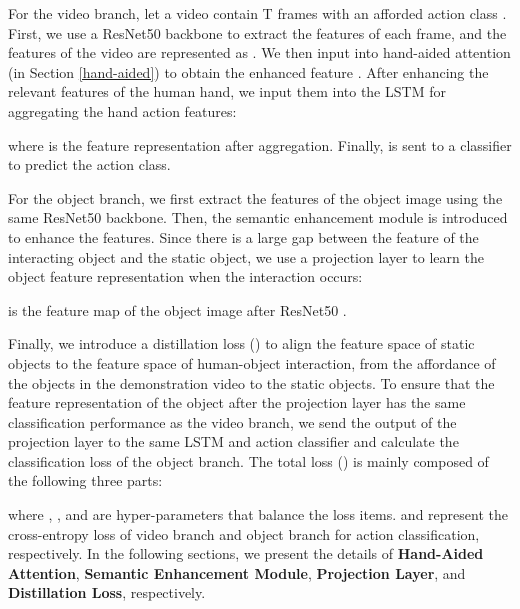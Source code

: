 \documentclass[journal,twoside]{IEEEtran}
\begin{document}
\par For the video branch, let a video contain T frames  with an afforded action class . First, we use a ResNet50 \cite{DBLP:conf/cvpr/HeZRS16} backbone to extract the features of each frame, and the features of the video are represented as . We then input  into hand-aided attention (in Section \ref{hand-aided}) to obtain the enhanced feature . After enhancing the relevant features of the human hand, we input them into the LSTM \cite{hochreiter1997long} for aggregating the hand action features:

where  is the feature representation after aggregation. Finally,  is sent to a classifier to predict the action class. 

\par For the object branch, we first extract the features of the object image using the same ResNet50 backbone. Then, the semantic enhancement module  is introduced to enhance the features. Since there is a large gap between the feature of the interacting object and the static object, we use a projection layer  to learn the object feature representation  when the interaction occurs:

 is the feature map of the object image after ResNet50 \cite{DBLP:conf/cvpr/HeZRS16}.

Finally, we introduce a distillation loss () to align the feature space of static objects to the feature space of human-object interaction, from the affordance of the objects in the demonstration video to the static objects. To ensure that the feature representation of the object after the projection layer has the same classification performance as the video branch, we send the output of the projection layer to the same LSTM and action classifier and calculate the classification loss of the object branch. The total loss () is mainly composed of the following three parts:

where , , and  are hyper-parameters that balance the loss items.  and  represent the cross-entropy loss of video branch and object branch for action classification, respectively. 
In the following sections, we present the details of \textbf{Hand-Aided Attention}, \textbf{Semantic Enhancement Module}, \textbf{Projection Layer}, and \textbf{Distillation Loss}, respectively.
\end{document}
